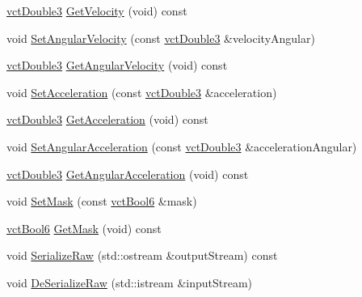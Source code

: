 \begin{DoxyCompactItemize}
\item 
\hyperlink{vct_fixed_size_vector_types_8h_a4a89122c9d7f72c3f31fe8126e17c3af}{vct\+Double3} \hyperlink{classprm_velocity_cartesian_set_abf320f73098c702eabbbac9bcb041a88}{Get\+Velocity} (void) const 
\item 
void \hyperlink{classprm_velocity_cartesian_set_a33f3ab55adb10f0d4756f2a1ec99fed1}{Set\+Angular\+Velocity} (const \hyperlink{vct_fixed_size_vector_types_8h_a4a89122c9d7f72c3f31fe8126e17c3af}{vct\+Double3} \&velocity\+Angular)
\item 
\hyperlink{vct_fixed_size_vector_types_8h_a4a89122c9d7f72c3f31fe8126e17c3af}{vct\+Double3} \hyperlink{classprm_velocity_cartesian_set_a2f5fe2e6f1d1a1d6da842b26849c7594}{Get\+Angular\+Velocity} (void) const 
\item 
void \hyperlink{classprm_velocity_cartesian_set_af0cd3b20970a8c0e8e002bc9756a10d1}{Set\+Acceleration} (const \hyperlink{vct_fixed_size_vector_types_8h_a4a89122c9d7f72c3f31fe8126e17c3af}{vct\+Double3} \&acceleration)
\item 
\hyperlink{vct_fixed_size_vector_types_8h_a4a89122c9d7f72c3f31fe8126e17c3af}{vct\+Double3} \hyperlink{classprm_velocity_cartesian_set_a179c51777f722bef8a29cdaac51ec55d}{Get\+Acceleration} (void) const 
\item 
void \hyperlink{classprm_velocity_cartesian_set_ace697cbb58e5a388248fd2439c3d405f}{Set\+Angular\+Acceleration} (const \hyperlink{vct_fixed_size_vector_types_8h_a4a89122c9d7f72c3f31fe8126e17c3af}{vct\+Double3} \&acceleration\+Angular)
\item 
\hyperlink{vct_fixed_size_vector_types_8h_a4a89122c9d7f72c3f31fe8126e17c3af}{vct\+Double3} \hyperlink{classprm_velocity_cartesian_set_a62666b656d443706e3c1c0cd7f22ed8d}{Get\+Angular\+Acceleration} (void) const 
\item 
void \hyperlink{classprm_velocity_cartesian_set_a69b5d82c093c1d279ae38b9cde075da4}{Set\+Mask} (const \hyperlink{vct_fixed_size_vector_types_8h_a1494a41869ce763813f2bf7f922b8fdd}{vct\+Bool6} \&mask)
\item 
\hyperlink{vct_fixed_size_vector_types_8h_a1494a41869ce763813f2bf7f922b8fdd}{vct\+Bool6} \hyperlink{classprm_velocity_cartesian_set_a9af002d206c1299609cb28aa49551433}{Get\+Mask} (void) const 
\item 
void \hyperlink{classprm_velocity_cartesian_set_a0f26231bf3105e057464f0eae85f7765}{Serialize\+Raw} (std\+::ostream \&output\+Stream) const 
\item 
void \hyperlink{classprm_velocity_cartesian_set_a8027cb74c7c236b631e097308260edd2}{De\+Serialize\+Raw} (std\+::istream \&input\+Stream)
\end{DoxyCompactItemize}
